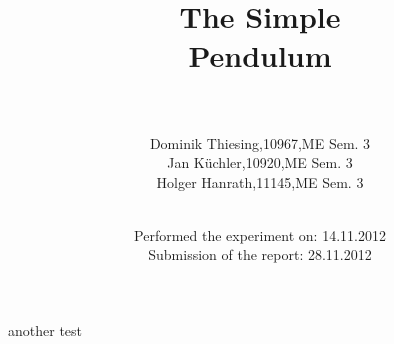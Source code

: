 \documentclass
[ a4paper, 10pt, DIV15, openany, oneside, headsepline,
footsepline,plainfootsepline,nochapterprefix,BCOR12mm,
DIVcalc,
]{scrreprt}
\newcommand{\autor}{ }
\newcommand{\titel}{The Simple\\Pendulum}
\begin{document}
\selectlanguage{\english}

\titlehead{\centering Science Lap Report}

\subject{}
\title{\titel}
\author{\begin{tabular}{p{15mm}p{41mm} p{15mm} p{25mm}}
 & \autor\\\\
 & Dominik Thiesing, & 10967,  & ME Sem. 3 \\
 & Jan K\"{u}chler,  & 10920,  & ME Sem. 3 \\
 & Holger Hanrath,   & 11145,  & ME Sem. 3 \\
\\\\
\end{tabular}}
\date{Performed the experiment on: 14.11.2012\\Submission of the report: 28.11.2012}

\publishers{
}

\maketitle

\pagebreak 

another test
\end{document}
